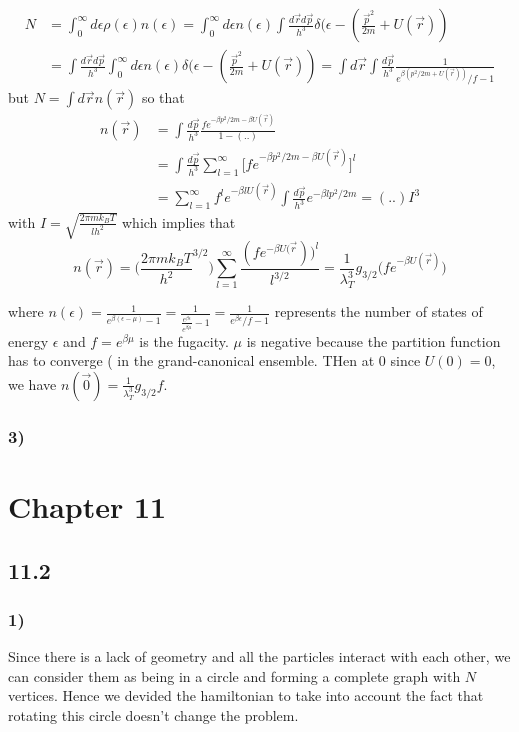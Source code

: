 \documentclass[10pt,a4paper]{book}
\begin{document}
\begin{align*}
N&=\int_{0}^{\infty}d\epsilon \rho(\epsilon)n(\epsilon)=\int_0^{\infty} d\epsilon n(\epsilon) \int\frac{d\vec{r}d\vec{p}}{h^3}\delta(\epsilon-(\frac{\vec{p}^2}{2m}+U(\vec{r}))\\
&=\int\frac{d\vec{r}d\vec{p}}{h^3}\int_0^{\infty}d\epsilon n(\epsilon)\delta(\epsilon-(\frac{\vec{p}^2}{2m}+U(\vec{r}))=\int d\vec{r}\int\frac{d\vec{p}}{h^3} \frac{1}{e^{\beta(p^2/2m+U(\vec{r}))}/f-1}
\end{align*}
but $N=\int d\vec{r}n(\vec{r})$ so that
\begin{align*}
n(\vec{r})&=\int\frac{d\vec{p}}{h^3}\frac{fe^{-\beta p^2/2m-\beta U(\vec{r})}}{1-(..)}\\
&=\int\frac{d\vec{p}}{h^3}\sum_{l=1}^{\infty}\bigg[fe^{-\beta p^2/2m-\beta U(\vec{r})}\bigg]^l\\
&=\sum_{l=1}^{\infty}f^le^{-\beta lU(\vec{r})}\int\frac{d\vec{p}}{h^3}e^{-\beta lp^2/2m}=(..)I^3
\end{align*}
with $I=\sqrt{\frac{2\pi m k_BT}{lh^2}}$ which implies that 
$$n(\vec{r})=\bigg(\frac{2\pi mk_BT}{h^2}^{3/2}\bigg)\sum_{l=1}^{\infty}\frac{(fe^{-\beta U(\vec{r}}))^l}{l^{3/2}}=\frac{1}{\lambda_T^3}g_{3/2}\bigg(fe^{-\beta U(\vec{r})}\bigg)$$



where $n(\epsilon)=\frac{1}{e^{\beta(\epsilon-\mu)}-1}=\frac{1}{\frac{e^{\beta\epsilon}}{e^{\beta\mu}}-1}=\frac{1}{e^{\beta\epsilon}/f-1}$ represents the number of states of energy $\epsilon$ and $f=e^{\beta\mu}$ is the fugacity. $\mu$ is negative because the partition function has to converge ( in the grand-canonical ensemble. 
THen at $0$ since $U(0)=0$, we have $n(\vec{0})=\frac{1}{\lambda_T^3}g_{3/2}f$. 
 
 
\subsection*{3)}





\chapter*{Chapter 11}


\section*{11.2}

\subsection*{1)}
Since there is a lack of geometry and all the particles interact with each other, we can consider them as being in a circle and forming a complete graph with $N$ vertices. Hence we devided the hamiltonian to take into account the fact that rotating this circle doesn't change the problem.
\end{document}
